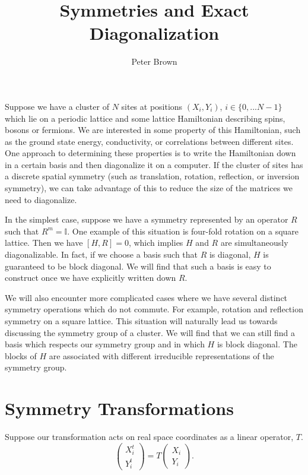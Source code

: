 \documentclass{article}
\author{Peter Brown}
\title{Symmetries and Exact Diagonalization}
\theoremstyle{definition}
\begin{document}
\maketitle

Suppose we have a cluster of $N$ sites at positions $(X_i,Y_i)$, $i \in \{0,...N-1\}$ which lie on a periodic lattice and some lattice Hamiltonian describing spins, bosons or fermions. We are interested in some property of this Hamiltonian, such as the ground state energy, conductivity, or correlations between different sites. One approach to determining these properties is to write the Hamiltonian down in a certain basis and then diagonalize it on a computer. If the cluster of sites has a discrete spatial symmetry (such as translation, rotation, reflection, or inversion symmetry), we can take advantage of this to reduce the size of the matrices we need to diagonalize.

In the simplest case, suppose we have a symmetry represented by an operator $R$ such that $R^m = \mathbb{I}$. One example of this situation is four-fold rotation on a square lattice.  Then we have $[H,R] = 0$, which implies $H$ and $R$ are simultaneously diagonalizable. In fact, if we choose a basis such that $R$ is diagonal, $H$ is guaranteed to be block diagonal. We will find that such a basis is easy to construct once we have explicitly written down $R$.

We will also encounter more complicated cases where we have several distinct symmetry operations which do not commute. For example, rotation and reflection symmetry on a square lattice. This situation will naturally lead us towards discussing the symmetry group of a cluster. We will find that we can still find a basis which respects our symmetry group and in which $H$ is block diagonal. The blocks of $H$ are associated with different irreducible representations of the symmetry group.


\section{Symmetry Transformations}
Suppose our transformation acts on real space coordinates as a linear operator, $T$.
\begin{equation}
\begin{pmatrix}
X^t_i \\ Y^t_i 
\end{pmatrix}
=
T
\begin{pmatrix}
X_i \\ Y_i
\end{pmatrix}.
\end{equation}
\end{document}
